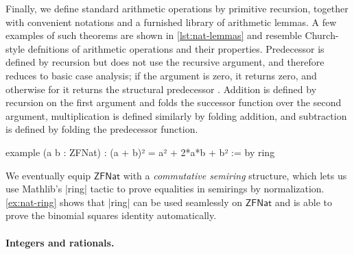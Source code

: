 Finally, we define standard arithmetic operations by primitive recursion, together with convenient notations and a furnished library of arithmetic lemmas.
A few examples of such theorems are shown in \cref{lst:nat-lemmas} and resemble Church-style defnitions of arithmetic operations and their properties.
Predecessor is defined by recursion but does not use the recursive argument, and therefore reduces to basic case analysis; if the argument is zero, it returns zero, and otherwise for  it returns the structural predecessor .
Addition is defined by recursion on the first argument and folds the successor function over the second argument, multiplication is defined similarly by folding addition, and subtraction is defined by folding the predecessor function.
\begin{leanlisting}[title={Example of ring equality on $\mathsf{ZFNat}$.}, label=ex:nat-ring, float=t]
example (a b : ZFNat) : (a + b)² = a² + 2*a*b + b² := by ring
\end{leanlisting}
%
We eventually equip $\mathsf{ZFNat}$ with a \emph{commutative semiring} structure, which lets us use Mathlib's \inlinelean|ring| tactic to prove equalities in semirings by normalization.
\cref{ex:nat-ring} shows that \inlinelean|ring| can be used seamlessly on $\mathsf{ZFNat}$ and is able to prove the binomial squares identity automatically.

\paragraph*{Integers and rationals.}
\newcommand{\zrel}{\ensuremath{\sim_{\mathbb{Z}}}}

